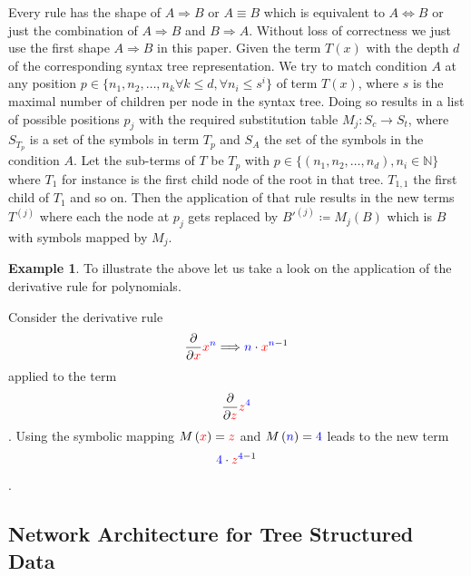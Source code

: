 \documentclass{scrartcl}
\theoremstyle{definition}
\newtheorem{exmp}{Example}[section]
\begin{document}
Every rule has the shape of $A \Longrightarrow B$ or $A \equiv B$ which is equivalent to $A \Longleftrightarrow B$ or just the combination of $A \Longrightarrow B$ and $B \Longrightarrow A$.
Without loss of correctness we just use the first shape $A \Longrightarrow B$ in this paper. Given the term $T\left(x\right)$ with the depth $d$ of the corresponding syntax tree representation.
We try to match condition $A$ at any position $p \in \big\{ n_1, n_2, \dots, n_k \forall k \leq d, \forall n_i \leq s^i \big\}$ of term $T\left(x\right)$,
where $s$ is the maximal number of children per node in the syntax tree.
Doing so results in a list of possible positions $p_j$ with the required substitution table $M_j: S_c \to S_t$,
where $S_{T_p}$ is a set of the symbols in term $T_p$ and $S_A$ the set of the symbols in the condition $A$.
Let the sub-terms of $T$ be $T_p$ with $p \in \big\{\left( n_1, n_2, \dots, n_d \right) , n_i \in \mathbb{N} \big\}$ where $T_1$ for instance is the first child node of the root in that tree.
$T_{1,1}$ the first child of $T_1$ and so on.
Then the application of that rule results in the new terms $T^{(j)}$ where each the node at $p_j$ gets replaced by $B'^{(j)} \coloneqq M_j\left( B \right)$ which is $B$ with symbols mapped by $M_j$. 

\begin{exmp}
To illustrate the above let us take a look on the application of the derivative rule for polynomials.

Consider the derivative rule
\begin{align}
	\frac{\partial}{\partial {\color{red}x}} {\color{red}x}^{\color{blue}n} \Longrightarrow {\color{blue}n}\cdot {\color{red}x}^{{\color{blue}n}-1} 
\end{align}
applied to the term
\begin{align}
	\frac{\partial}{\partial {\color{red}z}} {\color{red}z}^{\color{blue}4}
\end{align}.
Using the symbolic mapping $M\left({\color{red}x}\right) = \color{red}z$ and $M\left({\color{blue}n} \right) = {\color{blue}4}$ leads to the new term
\begin{align}
	{\color{blue}4}\cdot {\color{red}z}^{{\color{blue}4}-1} 
\end{align}.

\end{exmp}

\subsection{Network Architecture for Tree Structured Data}
\end{document}
